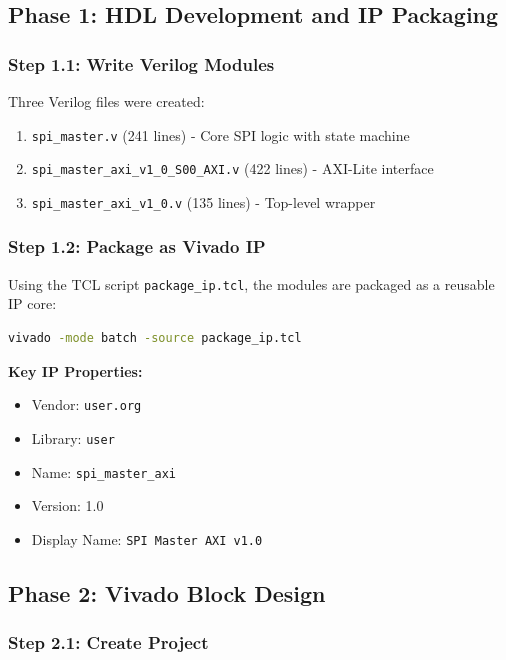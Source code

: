 \documentclass[11pt,a4paper]{article}
\begin{document}
\subsection{Phase 1: HDL Development and IP Packaging}

\subsubsection{Step 1.1: Write Verilog Modules}

Three Verilog files were created:
\begin{enumerate}
    \item \texttt{spi\_master.v} (241 lines) - Core SPI logic with state machine
    \item \texttt{spi\_master\_axi\_v1\_0\_S00\_AXI.v} (422 lines) - AXI-Lite interface
    \item \texttt{spi\_master\_axi\_v1\_0.v} (135 lines) - Top-level wrapper
\end{enumerate}

\subsubsection{Step 1.2: Package as Vivado IP}

Using the TCL script \texttt{package\_ip.tcl}, the modules are packaged as a reusable IP core:

\begin{lstlisting}[language=bash, caption=IP Packaging Command]
vivado -mode batch -source package_ip.tcl
\end{lstlisting}

\textbf{Key IP Properties:}
\begin{itemize}
    \item Vendor: \texttt{user.org}
    \item Library: \texttt{user}
    \item Name: \texttt{spi\_master\_axi}
    \item Version: 1.0
    \item Display Name: \texttt{SPI Master AXI v1.0}
\end{itemize}

\subsection{Phase 2: Vivado Block Design}

\subsubsection{Step 2.1: Create Project}
\end{document}
